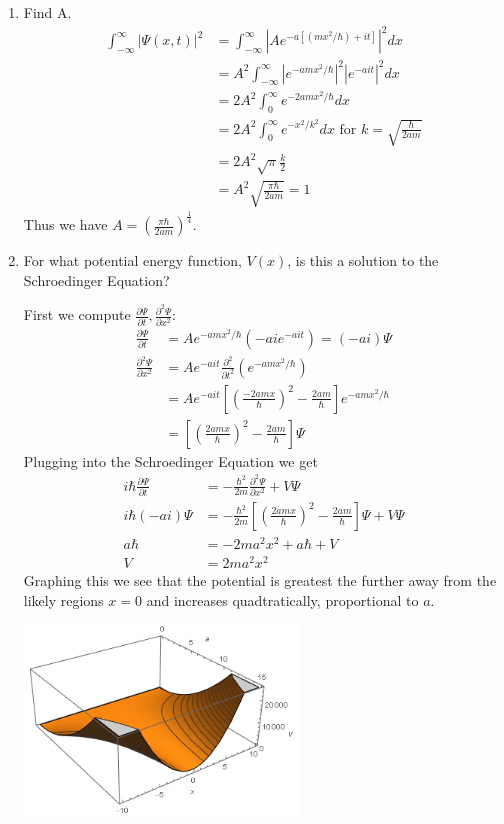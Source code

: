 \documentclass{article}
\newcommand{\ddt}[1]{\frac{\partial #1}{\partial t}}
\newcommand{\dddx}[1]{\frac{\partial^2 #1}{\partial x^2}}
\newcommand{\bracket}[1]{\left[ #1 \right]}
\newcommand{\paren}[1]{\left( #1 \right)}
\newcommand{\intinf}{\int_{-\infty}^\infty}
\newcommand{\intzinf}{\int_{0}^\infty}
\begin{document}
\begin{enumerate}[label=(\alph*)]
  \item Find A.
    \begin{align*}
      \intinf |\Psi(x,t)|^2 &= \intinf |Ae^{-a\bracket{(mx^2/\hbar) + it}}|^2 dx \\
                            &=  A^2\intinf |e^{-amx^2/\hbar}|^2 |e^{-ait}|^2 dx \\
                            &= 2A^2 \intzinf e^{-2amx^2/\hbar}dx \\
                            &= 2A^2 \intzinf e^{-x^2/k^2}dx \text{ for } k = \sqrt{\frac\hbar{2am}} \\
                            &= 2A^2 \sqrt{\pi} \frac{k}{2} \\
                            &= A^2 \sqrt{\frac{\pi\hbar}{2am}} = 1
    \end{align*}
    Thus we have $A = \paren{\frac{\pi\hbar}{2am}}^{\frac14}$.
  \item For what potential energy function, $V(x)$, is this a solution to the Schroedinger Equation?
    
    First we compute \(\ddt{\Psi},\dddx{\Psi}\):
    \begin{align*}
      \ddt{\Psi}  &= Ae^{-amx^2/\hbar}\paren{-aie^{-ait}} = (-ai)\Psi \\
      \dddx{\Psi} &= Ae^{-ait}\frac{\partial^2}{\partial t^2} \paren{e^{-amx^2/\hbar}} \\
                  &= Ae^{-ait} \bracket{ \paren{\frac{-2amx}{\hbar}}^2 - \frac{2am}{\hbar}} e^{-amx^2/\hbar}  \\
                  &= \bracket{\paren{\frac{2amx}{\hbar}}^2 - \frac{2am}{\hbar}} \Psi
    \end{align*}
    Plugging into the Schroedinger Equation we get
    \begin{align*}
        i\hbar\ddt{\Psi} &= -\frac{\hbar^2}{2m}\dddx{\Psi} + V \Psi \\
        i\hbar(-ai){\Psi} &= -\frac{\hbar^2}{2m}\bracket{\paren{\frac{2amx}{\hbar}}^2 -  \frac{2am}{\hbar}}\Psi + V \Psi \\
                  a\hbar &= -2ma^2x^2 + a\hbar + V \\
                  V &= 2ma^2x^2
    \end{align*}
    Graphing this we see that the potential is greatest the further away from the likely regions \(x=0\) and increases quadtratically, proportional to \(a\).
    \centerline{\includegraphics[height=2in]{1-9b.png}}


\end{enumerate}
\end{document}
